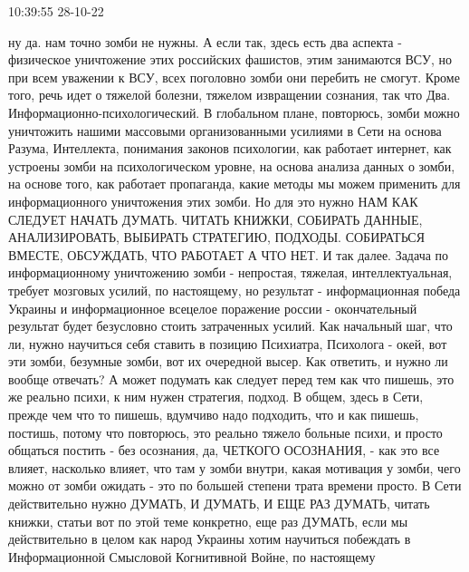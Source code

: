 10:39:55 28-10-22

ну да. нам точно зомби не нужны. А если так, здесь есть два аспекта - физическое
уничтожение этих российских фашистов, этим занимаются ВСУ, но при всем уважении
к ВСУ, всех поголовно зомби они перебить не смогут. Кроме того, речь идет о
тяжелой болезни, тяжелом извращении сознания, так что Два.
Информационно-психологический. В глобальном плане, повторюсь, зомби можно
уничтожить нашими массовыми организованными усилиями в Сети на основа Разума,
Интеллекта, понимания законов психологии, как работает интернет, как устроены
зомби на психологическом уровне, на основа анализа данных о зомби, на основе
того, как работает пропаганда, какие методы мы можем применить для
информационного уничтожения этих зомби. Но для это нужно НАМ КАК СЛЕДУЕТ НАЧАТЬ
ДУМАТЬ. ЧИТАТЬ КНИЖКИ, СОБИРАТЬ ДАННЫЕ, АНАЛИЗИРОВАТЬ, ВЫБИРАТЬ СТРАТЕГИЮ,
ПОДХОДЫ. СОБИРАТЬСЯ ВМЕСТЕ, ОБСУЖДАТЬ, ЧТО РАБОТАЕТ А ЧТО НЕТ. И так далее.
Задача по информационному уничтожению зомби - непростая, тяжелая,
интеллектуальная, требует мозговых усилий, по настоящему, но результат -
информационная победа Украины и информационное всецелое поражение россии -
окончательный результат будет безусловно стоить затраченных усилий. Как
начальный шаг, что ли, нужно научиться себя ставить в позицию Психиатра,
Психолога - окей, вот эти зомби, безумные зомби, вот их очередной высер. Как
ответить, и нужно ли вообще отвечать? А может подумать как следует перед тем
как что пишешь, это же реально психи, к ним нужен стратегия, подход. В общем,
здесь в Сети, прежде чем что то пишешь, вдумчиво надо подходить, что и как
пишешь, постишь, потому что повторюсь, это реально тяжело больные психи, и
просто общаться постить - без осознания, да, ЧЕТКОГО ОСОЗНАНИЯ, - как это все
влияет, насколько влияет, что там у зомби внутри, какая мотивация у зомби, чего
можно от зомби ожидать - это по большей степени трата времени просто. В Сети
действительно нужно ДУМАТЬ, И ДУМАТЬ, И ЕЩЕ РАЗ ДУМАТЬ, читать книжки, статьи
вот по этой теме конкретно, еще раз ДУМАТЬ, если мы действительно в целом как
народ Украины хотим научиться побеждать в Информационной Смысловой Когнитивной
Войне, по настоящему

